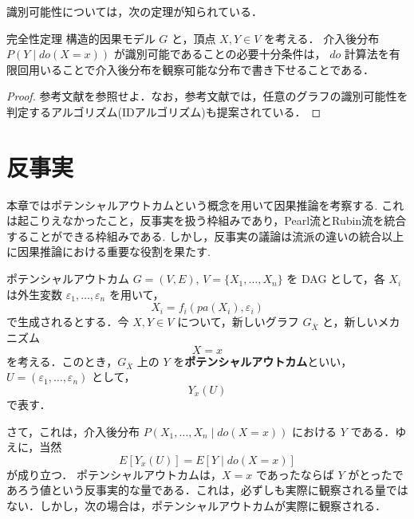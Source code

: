 \documentclass[uplatex, dvipdfmx]{jsarticle}
\begin{document}
識別可能性については，次の定理が知られている．

\begin{thm}{完全性定理}
  構造的因果モデル $G$ と，頂点 $X, Y \in V$ を考える．
  介入後分布 $P(Y \mid do(X=x))$ が識別可能であることの必要十分条件は， $do$ 計算法を有限回用いることで介入後分布を観察可能な分布で書き下せることである．
\end{thm}

\begin{proof}
  参考文献\cite{shpitser2006}を参照せよ．なお，参考文献\cite{shpitser2006}では，任意のグラフの識別可能性を判定するアルゴリズム(IDアルゴリズム)も提案されている．
\end{proof}

\newpage

\section{反事実}
本章ではポテンシャルアウトカムという概念を用いて因果推論を考察する.
これは起こりえなかったこと，反事実を扱う枠組みであり，Pearl流とRubin流を統合することができる枠組みである.
しかし，反事実の議論は流派の違いの統合以上に因果推論における重要な役割を果たす.

\begin{defn}{ポテンシャルアウトカム}
  $G = (V, E)$, $V = \{X_1, \dots, X_n\}$ を DAG として，各 $X_i$ は外生変数 $\varepsilon_1, \dots, \varepsilon_n$ を用いて，
  \begin{equation}
    X_i = f_i(pa(X_i), \varepsilon_i)
  \end{equation}
  で生成されるとする．今 $X, Y \in V$ について，新しいグラフ $G_{\bar{X}}$ と，新しいメカニズム
  \begin{equation}
    X = x
  \end{equation}
  を考える．このとき，$G_{\bar{X}}$ 上の $Y$ を\textbf{ポテンシャルアウトカム}といい， $U = (\varepsilon_1, \dots, \varepsilon_n)$ として，
  \begin{equation}
    Y_x(U)
  \end{equation}
  で表す．
\end{defn}

さて，これは，介入後分布 $P(X_1, \dots, X_n \mid do(X=x))$ における $Y$ である．ゆえに，当然
\begin{equation}
  E[Y_x(U)] = E[Y \mid do(X=x)]
\end{equation}
が成り立つ．
ポテンシャルアウトカムは，$X=x$ であったならば $Y$ がとったであろう値という反事実的な量である．これは，必ずしも実際に観察される量ではない．しかし，次の場合は，ポテンシャルアウトカムが実際に観察される．
\end{document}
